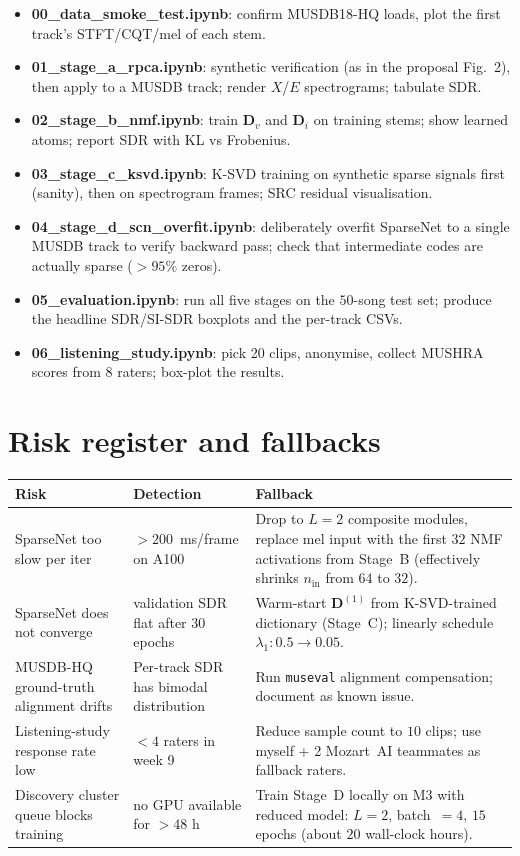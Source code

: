 \documentclass[10pt]{article}
\begin{document}
\begin{itemize}
\item \textbf{00\_data\_smoke\_test.ipynb}: confirm MUSDB18-HQ loads,
plot the first track's STFT/CQT/mel of each stem.
\item \textbf{01\_stage\_a\_rpca.ipynb}: synthetic verification (as in
the proposal Fig.~2), then apply to a MUSDB track; render
$X$/$E$ spectrograms; tabulate SDR.
\item \textbf{02\_stage\_b\_nmf.ipynb}: train $\bm{D}_v$ and $\bm{D}_i$
on training stems; show learned atoms; report SDR with KL vs Frobenius.
\item \textbf{03\_stage\_c\_ksvd.ipynb}: K-SVD training on synthetic
sparse signals first (sanity), then on spectrogram frames; SRC residual
visualisation.
\item \textbf{04\_stage\_d\_scn\_overfit.ipynb}: deliberately overfit
SparseNet to a single MUSDB track to verify backward pass; check that
intermediate codes are actually sparse ($>\!95\%$ zeros).
\item \textbf{05\_evaluation.ipynb}: run all five stages on the
$50$-song test set; produce the headline SDR/SI-SDR boxplots and the
per-track CSVs.
\item \textbf{06\_listening\_study.ipynb}: pick 20 clips, anonymise,
collect MUSHRA scores from $8$ raters; box-plot the results.
\end{itemize}

\section{Risk register and fallbacks}

\begin{longtable}{@{}p{4.0cm} p{4.5cm} p{6.5cm}@{}}
\toprule
\textbf{Risk} & \textbf{Detection} & \textbf{Fallback} \\
\midrule
\endhead
SparseNet too slow per iter & $>\!200$~ms/frame on A100 &
Drop to $L\!=\!2$ composite modules, replace mel input with the first $32$
NMF activations from Stage~B (effectively shrinks $n_\text{in}$ from
$64$ to $32$). \\
SparseNet does not converge & validation SDR flat after $30$ epochs &
Warm-start $\bm{D}^{(1)}$ from K-SVD-trained dictionary (Stage~C);
linearly schedule $\lambda_1\colon 0.5 \!\to\! 0.05$. \\
MUSDB-HQ ground-truth alignment drifts &
Per-track SDR has bimodal distribution &
Run \texttt{museval} alignment compensation; document as known issue. \\
Listening-study response rate low &
$<\!4$ raters in week 9 &
Reduce sample count to $10$ clips; use myself + 2 Mozart~AI teammates
as fallback raters. \\
Discovery cluster queue blocks training &
no GPU available for $>\!48$ h &
Train Stage~D locally on M3 with reduced model: $L\!=\!2$, batch~$=4$,
$15$ epochs (about $20$ wall-clock hours). \\
\bottomrule
\end{longtable}
\end{document}
